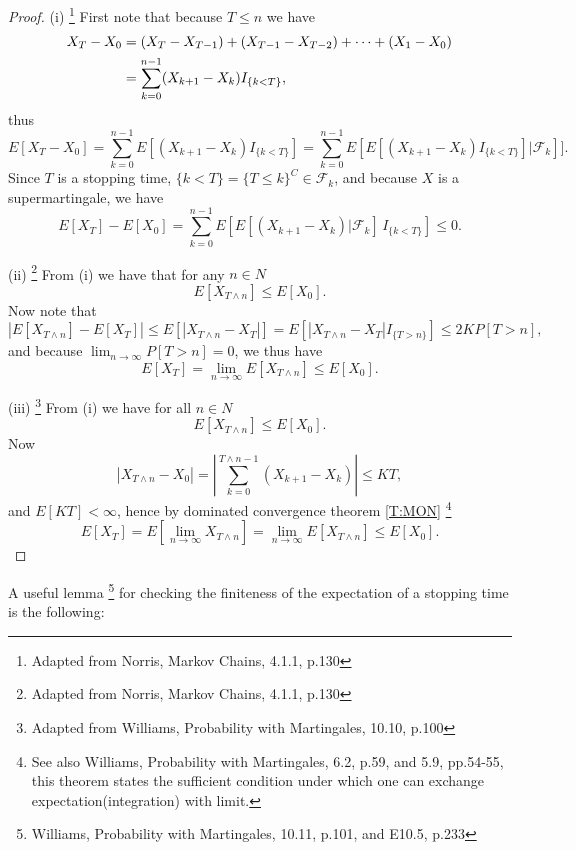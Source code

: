 \begin{proof}
  \item[(i)]
    \footnote{Adapted from Norris, Markov Chains, 4.1.1, p.130}
    First note that because $T\le n$ we have
    \begin{align*}
      X_T - X_0 &= (X_T-X_{T-1}) + (X_{T-1}-X_{T-2}) + \cdots + (X_1-X_0) 
                   \notag \\ 
                &= \sum_{k=0}^{n-1} (X_{k+1}-X_k) I_{\{k<T\}}, \notag
    \end{align*}
    thus
    \[
      E[X_T-X_0] = \sum_{k=0}^{n-1} E[(X_{k+1}-X_k) I_{\{k<T\}}]
           = \sum_{k=0}^{n-1} E[E[(X_{k+1}-X_k) I_{\{k<T\}}]|\mathcal{F}_k]].
    \]
    Since $T$ is a stopping time, $\{k<T\}=\{T\le k\}^C\in \mathcal{F}_k$, 
    and because $X$ is a supermartingale, we have
    \[
      E[X_T]-E[X_0] 
        = \sum_{k=0}^{n-1} E[E[(X_{k+1}-X_k)|\mathcal{F}_k] \, I_{\{k<T\}}]
        \le 0.
    \]
  \item[(ii)]
    \footnote{Adapted from Norris, Markov Chains, 4.1.1, p.130}
    From (i) we have that for any $n\in N$
    \[
      E[X_{T\wedge n}] \le E[X_0].
    \]
    Now note that
    \[
      | E[X_{T\wedge n}] - E[X_T] | 
         \le E[ | X_{T\wedge n} - X_T | ]
         = E[ | X_{T\wedge n} - X_T | I_{\{ T>n \}} ]
         \le 2K P[T>n],
    \]
    and because $\lim_{n\to\infty} P[T>n]=0$, we thus have
    \[
      E[X_T] = \lim_{n\to\infty} E[X_{T\wedge n}] \le E[X_0].
    \]
  \item[(iii)]
    \footnote{Adapted from Williams, Probability with Martingales, 10.10, p.100}
    From (i) we have for all $n\in N$
    \[
      E[X_{T\wedge n}] \le E[X_0].
    \]
    Now
    \[
      |X_{T\wedge n}-X_0| = |\sum_{k=0}^{T\wedge n-1} (X_{k+1} -X_k)| \le KT,
    \]
    and $E[KT]<\infty$, hence by dominated convergence theorem \ref{T:MON}
    \footnote{See also Williams, Probability with Martingales, 6.2, p.59, 
              and 5.9, pp.54-55, this theorem states the sufficient condition 
              under which one can exchange expectation(integration)
              with limit.}
    \[
      E[X_T] = E[\lim_{n\to\infty} X_{T\wedge n}] 
             = \lim_{n\to\infty} E[X_{T\wedge n}] \le E[X_0].
    \]
\end{proof}

A useful lemma 
\footnote{Williams, Probability with Martingales, 10.11, p.101, and E10.5, p.233}
for checking the finiteness of the expectation of a stopping time is the
following:

